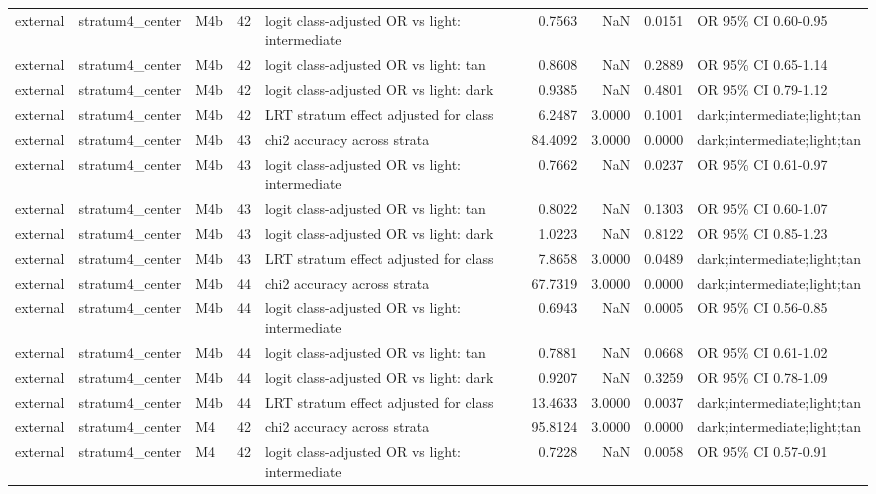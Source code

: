 \begin{tabular}{lllrlrrrl}
external & stratum4\_center & M4b & 42 & logit class-adjusted OR vs light: intermediate & 0.7563 & NaN & 0.0151 & OR 95\% CI 0.60-0.95 \\
external & stratum4\_center & M4b & 42 & logit class-adjusted OR vs light: tan & 0.8608 & NaN & 0.2889 & OR 95\% CI 0.65-1.14 \\
external & stratum4\_center & M4b & 42 & logit class-adjusted OR vs light: dark & 0.9385 & NaN & 0.4801 & OR 95\% CI 0.79-1.12 \\
external & stratum4\_center & M4b & 42 & LRT stratum effect adjusted for class & 6.2487 & 3.0000 & 0.1001 & dark;intermediate;light;tan \\
external & stratum4\_center & M4b & 43 & chi2 accuracy across strata & 84.4092 & 3.0000 & 0.0000 & dark;intermediate;light;tan \\
external & stratum4\_center & M4b & 43 & logit class-adjusted OR vs light: intermediate & 0.7662 & NaN & 0.0237 & OR 95\% CI 0.61-0.97 \\
external & stratum4\_center & M4b & 43 & logit class-adjusted OR vs light: tan & 0.8022 & NaN & 0.1303 & OR 95\% CI 0.60-1.07 \\
external & stratum4\_center & M4b & 43 & logit class-adjusted OR vs light: dark & 1.0223 & NaN & 0.8122 & OR 95\% CI 0.85-1.23 \\
external & stratum4\_center & M4b & 43 & LRT stratum effect adjusted for class & 7.8658 & 3.0000 & 0.0489 & dark;intermediate;light;tan \\
external & stratum4\_center & M4b & 44 & chi2 accuracy across strata & 67.7319 & 3.0000 & 0.0000 & dark;intermediate;light;tan \\
external & stratum4\_center & M4b & 44 & logit class-adjusted OR vs light: intermediate & 0.6943 & NaN & 0.0005 & OR 95\% CI 0.56-0.85 \\
external & stratum4\_center & M4b & 44 & logit class-adjusted OR vs light: tan & 0.7881 & NaN & 0.0668 & OR 95\% CI 0.61-1.02 \\
external & stratum4\_center & M4b & 44 & logit class-adjusted OR vs light: dark & 0.9207 & NaN & 0.3259 & OR 95\% CI 0.78-1.09 \\
external & stratum4\_center & M4b & 44 & LRT stratum effect adjusted for class & 13.4633 & 3.0000 & 0.0037 & dark;intermediate;light;tan \\
external & stratum4\_center & M4 & 42 & chi2 accuracy across strata & 95.8124 & 3.0000 & 0.0000 & dark;intermediate;light;tan \\
external & stratum4\_center & M4 & 42 & logit class-adjusted OR vs light: intermediate & 0.7228 & NaN & 0.0058 & OR 95\% CI 0.57-0.91 \\

\end{tabular}
